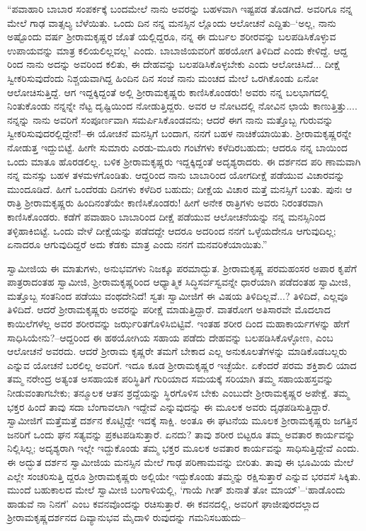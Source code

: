 “ಪವಾಹಾರಿ ಬಾಬಾರ ಸಂಪರ್ಕಕ್ಕೆ ಬಂದಮೇಲೆ ನಾನು ಅವರನ್ನು ಬಹಳವಾಗಿ ಇಷ್ಟಪಡ ತೊಡಗಿದೆ. ಅವರಿಗೂ ನನ್ನ ಮೇಲೆ ಗಾಢ ವಾತ್ಸಲ್ಯ ಬೆಳೆಯಿತು. ಒಂದು ದಿನ ನನ್ನ ಮನಸ್ಸಿನ ಲ್ಲೊಂದು ಆಲೋಚನೆ ಎದ್ದಿತು–‘ಅಲ್ಲ, ನಾನು ಅಷ್ಟೊಂದು ವರ್ಷ ಶ್ರೀರಾಮಕೃಷ್ಣರ ಜೊತೆ ಯಲ್ಲಿದ್ದರೂ, ನನ್ನ ಈ ದುರ್ಬಲ ಶರೀರವನ್ನು ಬಲಪಡಿಸಿಕೊಳ್ಳುವ ಉಪಾಯವನ್ನು ಮಾತ್ರ ಕಲಿಯಲಿಲ್ಲವಲ್ಲ’ ಎಂದು. ಬಾಬಾಜಿಯವರಿಗೆ ಹಠಯೋಗ ತಿಳಿದಿದೆ ಎಂದು ಕೇಳಿದ್ದೆ. ಆದ್ದ ರಿಂದ ನಾನು ಅದನ್ನು ಅವರಿಂದ ಕಲಿತು, ಈ ದೇಹವನ್ನು ಬಲಪಡಿಸಿಕೊಳ್ಳಬೇಕು ಎಂದು ಆಲೋಚಿಸಿದೆ... ದೀಕ್ಷೆ ಸ್ವೀಕರಿಸುವುದೆಂದು ನಿಶ್ಚಯವಾಗಿದ್ದ ಹಿಂದಿನ ದಿನ ಸಂಜೆ ನಾನು ಮಂಚದ ಮೇಲೆ ಒರಗಿಕೊಂಡು ಏನೋ ಆಲೋಚಿಸುತ್ತಿದ್ದೆ. ಆಗ ಇದ್ದಕ್ಕಿದ್ದಂತೆ ಅಲ್ಲಿ ಶ್ರೀರಾಮಕೃಷ್ಣರು ಕಾಣಿಸಿಕೊಂಡರು! ಅವರು ನನ್ನ ಬಲಭಾಗದಲ್ಲಿ ನಿಂತುಕೊಂಡು ನನ್ನನ್ನೇ ನೆಟ್ಟ ದೃಷ್ಟಿಯಿಂದ ನೋಡುತ್ತಿದ್ದರು. ಅವರ ಆ ನೋಟದಲ್ಲಿ ನೋವಿನ ಛಾಯೆ ಕಾಣುತ್ತಿತ್ತು.... ನನ್ನನ್ನು ನಾನು ಅವರಿಗೆ ಸಂಪೂರ್ಣವಾಗಿ ಸಮರ್ಪಿಸಿಕೊಂಡವನು; ಆದರೆ ಈಗ ನಾನು ಮತ್ತೊಬ್ಬ ಗುರುವನ್ನು ಸ್ವೀಕರಿಸುವುದರಲ್ಲಿದ್ದೇನೆ!–ಈ ಯೋಚನೆ ಮನಸ್ಸಿಗೆ ಬಂದಾಗ, ನನಗೆ ಬಹಳ ನಾಚಿಕೆಯಾಯಿತು. ಶ್ರೀರಾಮಕೃಷ್ಣರನ್ನೇ ನೋಡುತ್ತ ಇದ್ದುಬಿಟ್ಟೆ. ಹೀಗೇ ಸುಮಾರು ಎರಡು-ಮೂರು ಗಂಟೆಗಳು ಕಳೆದಿರಬಹುದು; ಆದರೂ ನನ್ನ ಬಾಯಿಂದ ಒಂದು ಮಾತೂ ಹೊರಡಲಿಲ್ಲ. ಬಳಿಕ ಶ್ರೀರಾಮಕೃಷ್ಣರು ಇದ್ದಕ್ಕಿದ್ದಂತೆ ಅದೃಶ್ಯರಾದರು. ಈ ದರ್ಶನದ ಪರಿ ಣಾಮವಾಗಿ ನನ್ನ ಮನಸ್ಸು ಬಹಳ ತಳಮಳಗೊಂಡಿತು. ಆದ್ದರಿಂದ ನಾನು ಬಾಬಾರಿಂದ ಯೋಗದೀಕ್ಷೆ ಪಡೆಯುವ ವಿಚಾರವನ್ನು ಮುಂದೂಡಿದೆ. ಹೀಗೆ ಒಂದೆರಡು ದಿನಗಳು ಕಳೆದಿರ ಬಹುದು; ದೀಕ್ಷೆಯ ವಿಚಾರ ಮತ್ತೆ ಮನಸ್ಸಿಗೆ ಬಂತು. ಪುನಃ ಆ ರಾತ್ರಿ ಶ್ರೀರಾಮಕೃಷ್ಣರು ಹಿಂದಿನಂತೆಯೇ ಕಾಣಿಸಿಕೊಂಡರು! ಹೀಗೆ ಅನೇಕ ರಾತ್ರಿಗಳು ಅವರು ನಿರಂತರವಾಗಿ ಕಾಣಿಸಿಕೊಂಡರು. ಕಡೆಗೆ ಪವಾಹಾರಿ ಬಾಬಾರಿಂದ ದೀಕ್ಷೆ ಪಡೆಯುವ ಆಲೋಚನೆಯನ್ನು ನನ್ನ ಮನಸ್ಸಿನಿಂದ ತಳ್ಳಿಹಾಕಿಬಿಟ್ಟೆ. ಒಂದು ವೇಳೆ ದೀಕ್ಷೆಯನ್ನು ಪಡೆದದ್ದೇ ಆದರೂ ಅದರಿಂದ ನನಗೆ ಒಳ್ಳೆಯದೇನೂ ಆಗುವುದಿಲ್ಲ; ಏನಾದರೂ ಆಗುವುದಿದ್ದರೆ ಅದು ಕೆಡಕು ಮಾತ್ರ ಎಂದು ನನಗೆ ಮನವರಿಕೆಯಾಯಿತು.”

ಸ್ವಾಮೀಜಿಯ ಈ ಮಾತುಗಳು, ಅನುಭವಗಳು ನಿಜಕ್ಕೂ ಪರಮಾದ್ಭುತ. ಶ್ರೀರಾಮಕೃಷ್ಣ ಪರಮಹಂಸರ ಅಪಾರ ಕೃಪೆಗೆ ಪಾತ್ರರಾದಂತಹ ಸ್ವಾಮೀಜಿ, ಶ್ರೀರಾಮಕೃಷ್ಣರಿಂದ ಆಧ್ಯಾತ್ಮಿಕ ಸಿದ್ಧಿಸರ್ವಸ್ವವನ್ನೇ ಧಾರೆಯಾಗಿ ಪಡೆದಂತಹ ಸ್ವಾಮೀಜಿ, ಮತ್ತೊಬ್ಬ ಸಂತನಿಂದ ಪಡೆಯು ವಂಥದೇನಿದೆ! ಸ್ವತಃ ಸ್ವಾಮೀಜಿಗೆ ಈ ವಿಷಯ ತಿಳಿದಿಲ್ಲವೆ...? ತಿಳಿದಿದೆ, ಎಲ್ಲವೂ ತಿಳಿದಿದೆ. ಆದರೆ ಶ್ರೀರಾಮಕೃಷ್ಣರು ಅವರನ್ನು ಪರೀಕ್ಷೆ ಮಾಡುತ್ತಿದ್ದಾರೆ. ವಾತರೋಗ ಅತಿಸಾರವೇ ಮೊದಲಾದ ಕಾಯಿಲೆಗಳೆಲ್ಲ ಅವರ ಶರೀರವನ್ನು ಜರ್ಝರಿತಗೊಳಿಸಿಬಿಟ್ಟಿವೆ. ಇಂತಹ ಶರೀರ ದಿಂದ ಮಹಾಕಾರ್ಯಗಳನ್ನು ಹೇಗೆ ಸಾಧಿಸಿಯೇನು?–ಆದ್ದರಿಂದ ಈ ಹಠಯೋಗಿಯ ಸಹಾಯ ಪಡೆದು ದೇಹವನ್ನು ಬಲಪಡಿಸಿಕೊಳ್ಳೋಣ, ಎಂಬ ಆಲೋಚನೆ ಅವರದು. ಆದರೆ ಶ್ರೀರಾಮ ಕೃಷ್ಣರೇ ತಮಗೆ ಬೇಕಾದ ಎಲ್ಲ ಅನುಕೂಲತೆಗಳನ್ನು ಮಾಡಿಕೊಡಬಲ್ಲರು ಎನ್ನುವ ಯೋಚನೆ ಬರಲಿಲ್ಲ ಅವರಿಗೆ. ಇದೂ ಕೂಡ ಶ್ರೀರಾಮಕೃಷ್ಣರ ಇಚ್ಛೆಯೇ. ಏಕೆಂದರೆ ಪರಮ ಶಕ್ತಿಶಾಲಿ ಯಾದ ತಮ್ಮ ನರೇಂದ್ರ ಅತ್ಯಂತ ಅಸಹಾಯಕ ಪರಿಸ್ಥಿತಿಗೆ ಗುರಿಯಾದ ಸಮಯಕ್ಕೆ ಸರಿಯಾಗಿ ತಮ್ಮ ಸಹಾಯಹಸ್ತವನ್ನು ನೀಡುವಂತಾಗಬೇಕು; ತನ್ಮೂಲಕ ಆತನ ಶ್ರದ್ದೆಯನ್ನು ಸ್ಥಿರಗೊಳಿಸ ಬೇಕು ಎಂಬುದೇ ಶ್ರೀರಾಮಕೃಷ್ಣರ ಅಪೇಕ್ಷೆ. ತಮ್ಮ ಭಕ್ತರ ಹಿಂದೆ ತಾವು ಸದಾ ಬೆಂಗಾವಲಾಗಿ ಇದ್ದೇವೆ ಎನ್ನುವುದನ್ನು ಈ ಮೂಲಕ ಅವರು ದೃಢಪಡಿಸುತ್ತಿದ್ದಾರೆ. ಸ್ವಾಮೀಜಿಗೆ ಮತ್ತೆಮತ್ತೆ ದರ್ಶನ ಕೊಟ್ಚಿದ್ದೇ ಇದಕ್ಕೆ ಸಾಕ್ಷಿ. ಅಂತೂ ಈ ಘಟನೆಯ ಮೂಲಕ ಶ್ರೀರಾಮಕೃಷ್ಣರು ಜಗತ್ತಿನ ಜನರಿಗೆ ಒಂದು ಘನ ಸತ್ಯವನ್ನು ಪ್ರಕಟಪಡಿಸುತ್ತಾರೆ. ಏನದು? ತಾವು ಶರೀರ ಬಿಟ್ಟರೂ ತಮ್ಮ ಅವತಾರ ಕಾರ್ಯವನ್ನು ನಿಲ್ಲಿಸಿಲ್ಲ; ಅದೃಶ್ಯರಾಗಿ ಇಲ್ಲೇ ಇದ್ದುಕೊಂಡು ತಮ್ಮ ಭಕ್ತರ ಮೂಲಕ ಅವತಾರ ಕಾರ್ಯವನ್ನು ಸಾಧಿಸುತ್ತಿದ್ದೇವೆ ಎಂದು. ಈ ಅದ್ಭುತ ದರ್ಶನ ಸ್ವಾಮೀಜಿಯ ಮನಸ್ಸಿನ ಮೇಲೆ ಗಾಢ ಪರಿಣಾಮವನ್ನು ಬೀರಿತು. ತಾವು ಈ ಭೂಮಿಯ ಮೇಲೆ ಎಲ್ಲೇ ಸಂಚರಿಸುತ್ತಿ ದ್ದರೂ ಶ್ರೀರಾಮಕೃಷ್ಣರು ಅಲ್ಲಿಯೇ ಇದ್ದುಕೊಂಡು ತಮ್ಮನ್ನು ರಕ್ಷಿಸುತ್ತಾರೆ ಎನ್ನುವ ಭರವಸೆ ಸಿಕ್ಕಿತು. ಮುಂದೆ ಬಹುಕಾಲದ ಮೇಲೆ ಸ್ವಾಮೀಜಿ ಬಂಗಾಳಿಯಲ್ಲಿ, ‘ಗಾಯೆ ಗೀತ್ ಶುನಾತೆ ತೋ ಮಾಯ್’–‘ಹಾಡೊಂದು ಹಾಡುವೆ ನಾ ನಿನಗೆ’ ಎಂಬ ಕವನವೊಂದನ್ನು ರಚಿಸುತ್ತಾರೆ. ಈ ಕವನದಲ್ಲಿ, ಅವರಿಗೆ ಘಾಜೀಪುರದಲ್ಲಾದ ಶ್ರೀರಾಮಕೃಷ್ಣದರ್ಶನದ ದಿವ್ಯಾನುಭವ ಮೈದಾಳಿ ರುವುದನ್ನು ಗಮನಿಸಬಹುದು–

